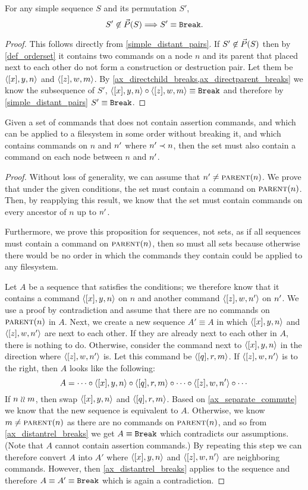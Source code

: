 \begin{mycor}\label{order_is_only_possible}
For any simple sequence $S$ and its permutation $S'$, 
\[ S'\not\in\vec{P}({S}) \Longrightarrow S'\equiv\mathtt{Break}. \]
\end{mycor}
\begin{proof}
This follows directly from \cref{simple_distant_pairs}.
If $S'\not\in\vec{P}({S})$ then by \cref{def_orderset}
it contains two commands on a node $n$ and its parent
that placed next to each other do not form
a construction or destruction pair.
Let them be $\langle{[x],y,n}\rangle$ and $\langle{[z],w,m}\rangle$.
By \cref{ax_directchild_breaks,ax_directparent_breaks}
we know the subsequence of $S'$,
$\langle{[x],y,n}\rangle\circ\langle{[z],w,m}\rangle\equiv\mathtt{Break}$ and therefore by \cref{simple_distant_pairs}
$S'\equiv\mathtt{Break}$.
\end{proof}



\begin{mylem}\label{connected_changes}
Given a set of commands that
does not contain assertion commands,
and which can be applied to a filesystem in some order without breaking it,
and which contains commands on $n$ and $n'$ where $n'\prec n$,
then the set must also contain a command
on each node between $n$ and $n'$.
\end{mylem}
\begin{proof}
Without loss of generality, we can assume that $n'\neq\text{\normalfont\scshape{parent}}(n)$.
We prove that under the given conditions, the set must contain a command on $\text{\normalfont\scshape{parent}}(n)$.
Then, by reapplying this result, we know that the set must contain commands on every
ancestor of $n$ up to $n'$.

Furthermore,
we prove this proposition for sequences, not sets, as if all sequences must contain a command on $\text{\normalfont\scshape{parent}}(n)$,
then so must all sets because otherwise there would be no order in which the commands they contain could be
applied to any filesystem.

Let $A$ be a sequence that satisfies the conditions;
we therefore know that it contains a command $\langle{[x],y,n}\rangle$ on $n$
and another command $\langle{[z],w,n'}\rangle$ on $n'$.
We use a proof by contradiction and assume that there are no commands on $\text{\normalfont\scshape{parent}}(n)$ in $A$.
Next, we create a new sequence $A'\equiv A$ in which $\langle{[x],y,n}\rangle$ and $\langle{[z],w,n'}\rangle$ are next to each other.
If they are already next to each other in $A$, there is nothing to do.
Otherwise, consider the command next to $\langle{[x],y,n}\rangle$ in the direction where $\langle{[z],w,n'}\rangle$ is.
Let this command be $\langle{[q],r,m}\rangle$.
If $\langle{[z],w,n'}\rangle$ is to the right, then $A$ looks like the following:
\[ A = \cdots\circ\langle{[x],y,n}\rangle\circ\langle{[q],r,m}\rangle\circ\cdots\circ\langle{[z],w,n'}\rangle\circ\cdots \]
If $n\mathrel{\wr\wr} m$, then swap $\langle{[x],y,n}\rangle$ and $\langle{[q],r,m}\rangle$. Based on \cref{ax_separate_commute} we know that the new
sequence is equivalent to $A$.
Otherwise, we know $m\neq\text{\normalfont\scshape{parent}}(n)$ as there are no commands on $\text{\normalfont\scshape{parent}}(n)$, and so
from \cref{ax_distantrel_breaks} we get $A\equiv\mathtt{Break}$ which contradicts our assumptions.
(Note that $A$ cannot contain assertion commands.)
By repeating this step we can therefore convert $A$ into $A'$ where $\langle{[x],y,n}\rangle$ and $\langle{[z],w,n'}\rangle$ are neighboring commands.
However, then \cref{ax_distantrel_breaks} applies to the sequence and therefore $A\equiv A'\equiv\mathtt{Break}$ which
is again a contradiction.
\end{proof}



